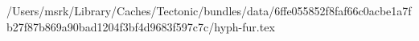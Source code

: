 /Users/msrk/Library/Caches/Tectonic/bundles/data/6ffe055852f8faf66c0acbe1a7fb27f87b869a90bad1204f3bf4d9683f597c7c/hyph-fur.tex